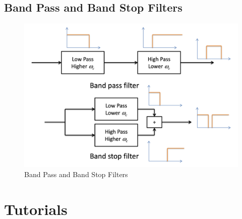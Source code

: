 \documentclass[oneside]{book}
\begin{document}
            \section{Band Pass and Band Stop Filters}
                \begin{figure}[H]
                    \centering
                    \includegraphics[width=0.6\linewidth]{figures/band_pass_stop.png}
                    \caption{Band Pass and Band Stop Filters}
                \end{figure}
        \chapter{Tutorials}
            
\end{document}
